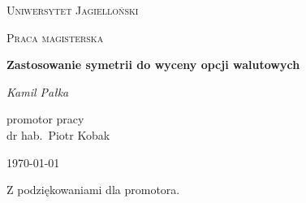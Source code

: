 \documentclass[11pt]{report}
\begin{document}
\begin{titlepage}
	\centering
	
	{\scshape\LARGE Uniwersytet Jagielloński \par}
	\vspace{1cm}
	{\scshape\Large Praca magisterska\par}
	\vspace{4,5cm}
	{\huge\bfseries Zastosowanie symetrii do wyceny opcji walutowych\par}
	\vspace{2cm}
	{\Large\itshape Kamil Pałka\par}
	\vfill
	\vspace{2cm}
	\begin{flushright}	
	promotor pracy \\
	dr hab.~Piotr Kobak
	\end{flushright}
	\vfill

	{\large \today\par}
\end{titlepage}

\newpage
\thispagestyle{empty}
\par\null\par\null\par\null\par\null\par\null\par\null\par\null\par\null\par\null\par\null\par\null\par\null\par\null\par\null\par\null\par\null\par\null\par\null\par\null\par\null\par\null\par\null\par\null\par\null\par\null\par\null\par\null\par\null\par\null\par\null\par\null\par\null\par\null\par\null\par
\begin{flushright}
Z podziękowaniami dla promotora.

\end{flushright}
\end{document}
